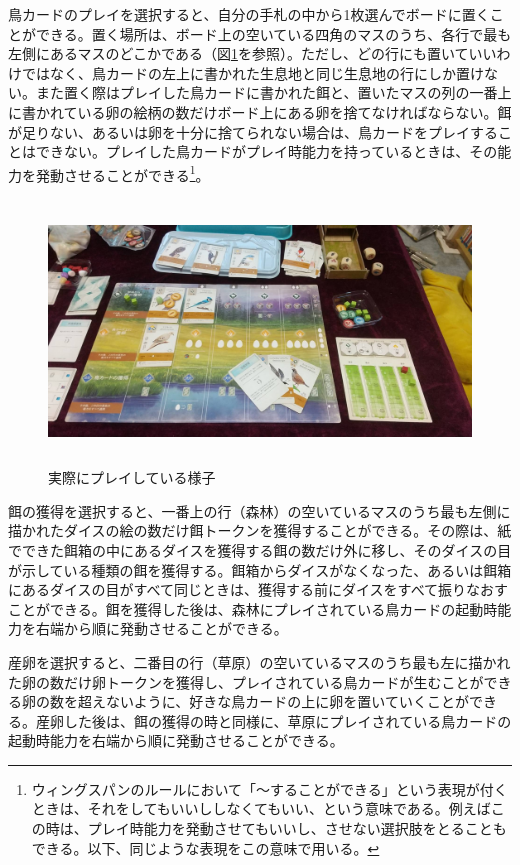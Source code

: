 \begin{multicols}{2}
鳥カードのプレイを選択すると、自分の手札の中から1枚選んでボードに置くことができる。置く場所は、ボード上の空いている四角のマスのうち、各行で最も左側にあるマスのどこかである（図\ref{fig:実際にプレイしている様子}を参照）。ただし、どの行にも置いていいわけではなく、鳥カードの左上に書かれた生息地と同じ生息地の行にしか置けない。また置く際はプレイした鳥カードに書かれた餌と、置いたマスの列の一番上に書かれている卵の絵柄の数だけボード上にある卵を捨てなければならない。餌が足りない、あるいは卵を十分に捨てられない場合は、鳥カードをプレイすることはできない。プレイした鳥カードがプレイ時能力を持っているときは、その能力を発動させることができる\footnote{ウィングスパンのルールにおいて「～することができる」という表現が付くときは、それをしてもいいししなくてもいい、という意味である。例えばこの時は、プレイ時能力を発動させてもいいし、させない選択肢をとることもできる。以下、同じような表現をこの意味で用いる。}。
\begin{figure}[htbp]
   \centering
   \includegraphics[height=7cm,width=15cm]{2025shinki/wing_span/real_play.jpg}
   \caption{実際にプレイしている様子}
   \label{fig:実際にプレイしている様子}
\end{figure}
\par
餌の獲得を選択すると、一番上の行（森林）の空いているマスのうち最も左側に描かれたダイスの絵の数だけ餌トークンを獲得することができる。その際は、紙でできた餌箱の中にあるダイスを獲得する餌の数だけ外に移し、そのダイスの目が示している種類の餌を獲得する。餌箱からダイスがなくなった、あるいは餌箱にあるダイスの目がすべて同じときは、獲得する前にダイスをすべて振りなおすことができる。餌を獲得した後は、森林にプレイされている鳥カードの起動時能力を右端から順に発動させることができる。
\par
産卵を選択すると、二番目の行（草原）の空いているマスのうち最も左に描かれた卵の数だけ卵トークンを獲得し、プレイされている鳥カードが生むことができる卵の数を超えないように、好きな鳥カードの上に卵を置いていくことができる。産卵した後は、餌の獲得の時と同様に、草原にプレイされている鳥カードの起動時能力を右端から順に発動させることができる。

\end{multicols}
